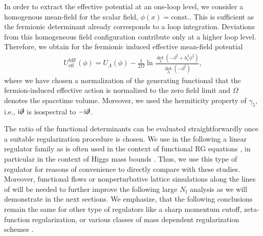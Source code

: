 \documentclass[twocolumn,aps,prd,showpacs,nofootinbib,superscriptaddress,preprintnumbers,floatfix,10pt]{revtex4-1}
\newcommand{\I}{\mathrm{i}}
\newcommand{\Nf}{N_{\mathrm{f}}}
\newcommand{\htop}{h_{\mathrm{t}}}
\newcommand{\UMF}{U^{\mathrm{MF}}_{\mathrm{eff}}}
\begin{document}
In order to extract the effective potential at an one-loop level, we consider a homogenous mean-field for the scalar field, $\phi(x) = \mathrm{const.}$.
This is sufficient as the fermionic determinant already corresponds to a loop integration. Deviations from this homogeneous field configuration contribute only at a higher loop level. 
Therefore, we obtain for the fermionic induced effective mean-field potential
%
\begin{align}
 \UMF(\phi) = U_{\Lambda}(\phi) - \frac{1}{2\Omega} \ln\frac{\det_{\Lambda}(-\partial^{2} + \htop^{2} \phi^{2})}{\det_{\Lambda}(-\partial^{2})},
\end{align}
%
where we have chosen a normalization of the generating functional that the fermion-induced effective action is normalized to the zero field limit and $\Omega$ denotes the spacetime volume. Moreover, we used the hermiticity property of $\gamma_{5}$, i.e., $\I\slashed{\partial}$ is isospectral to $-\I\slashed{\partial}$.


The ratio of the functional determinants can be evaluated straightforwardly once a suitable regularization procedure is chosen. We use in the following a linear regulator family as is often used in the context of functional RG equations \cite{Litim:2000ci,Litim:2001up}, in particular in the context of Higgs mass bounds \cite{Gies:2013fua,Gies:2014xha,Eichhorn:2014qka,Eichhorn:2015kea,Jakovac:2015kka,Borchardt:2016xju,Gies:2017zwf,Gies:2017ajd}.
Thus, we use this type of regulator for reasons of convenience to directly compare with these studies. Moreover, functional flows or nonperturbative lattice simulations along the lines of \cite{Gerhold:2007yb,Gerhold:2007gx,Gerhold:2009ub,Gerhold:2010bh,Gerhold:2010wv,Bulava:2013ep,Chu:2015nha} will be needed to further improve the following large $\Nf$ analysis as we will demonstrate in the next sections. 
We emphasize, that the following conclusions remain the same for other type of regulators like a sharp momentum cutoff, zeta-function regularization, or various classes of mass dependent regularization schemes \cite{Gies:2014xha}.
\end{document}
